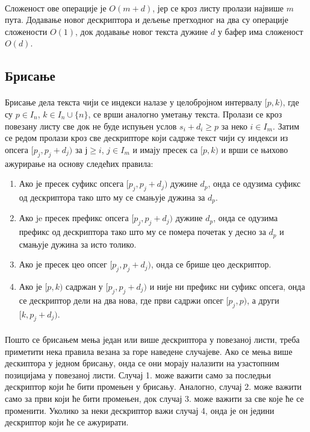\documentclass[12pt,oneside]{memoir}
\begin{document}
\paragraph{}
Сложеност ове операције је \(O(m + d)\), јер се кроз листу пролази највише \(m\) пута.
Додавање новог дескриптора и дељење претходног на два су операције сложености \(O(1)\), док
додавање новог текста дужине \(d\) у бафер има сложеност \(O(d)\).

\subsection{Брисање}
\paragraph{}
Брисање дела текста чији се индекси налазе у целобројном интервалу \([p, k)\), где су 
\(p \in I_n\), \(k \in I_n \cup \{n\}\), се врши аналогно уметању текста. 
Пролази се кроз повезану листу све док не буде испуњен услов \(s_i + d_i \geq p\) за неко 
\(i \in I_m\). Затим се редом пролази кроз све дескрипторе који садрже текст чији су индекси из опсега \([p_j, p_j+d_j)\) за \(ј \geq i\), \(j \in I_m\) и имају пресек са
\([p, k)\) и врши се њихово ажурирање на основу следећих правила:

\begin{enumerate}
	\item Ако је пресек суфикс опсега \([p_j, p_j+d_j)\) дужине \(d_p\), онда се одузима суфикс 
	од дескриптора тако што му се смањује дужина за \(d_p\).
	
	\item Ако je пресек префикс опсега \([p_j, p_j+d_j)\) дужине \(d_p\), онда се одузима префикс
	 од дескриптора тако што му се помера почетак у десно за \(d_p\) и смањује дужина за исто
	 толико.
	 
	\item Ако је пресек цео опсег \([p_j, p_j+d_j)\), онда се брише цео дескриптор.
	 
	\item Ако је \([p, k)\) садржан у \([p_j, p_j+d_j)\) и није ни префикс ни суфикс опсега,
	онда се дескриптор дели на два нова, где први садржи опсег \([p_j, p)\), а други 
	\([k, p_j+d_j)\).
\end{enumerate}
\paragraph{}
Пошто се брисањем мења један или више дескриптора у повезаној листи, треба
приметити нека правила везана за горе наведене случајеве. Ако се мења више дескиптора
у једном брисању, онда се они морају налазити на узастопним позицијама у повезаној листи.
Случај 1. може важити само за последњи дескриптор који ће бити промењен у брисању.
Аналогно, случај 2. може важити само за први који ће бити промењен, док случај 3. 
може важити за све које ће се променити. Уколико за неки дескриптор важи случај 4, 
онда је он једини дескриптор који ће се ажурирати.
\end{document}
